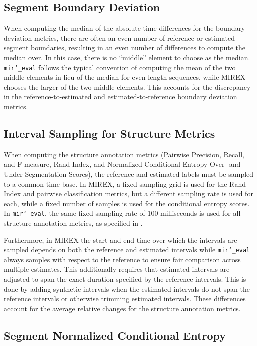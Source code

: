 \documentclass{article}
\def\mireval{\texttt{mir\char`_eval}}
\begin{document}
\subsection{Segment Boundary Deviation}

When computing the median of the absolute time differences for the boundary deviation metrics, there are often an even number of reference or estimated segment boundaries, resulting in an even number of differences to compute the median over.
In this case, there is no ``middle'' element to choose as the median.
\mireval{} follows the typical convention of computing the mean of the two middle elements in lieu of the median for even-length sequences, while MIREX chooses the larger of the two middle elements.
This accounts for the discrepancy in the reference-to-estimated and estimated-to-reference boundary deviation metrics.

\subsection{Interval Sampling for Structure Metrics}

When computing the structure annotation metrics (Pairwise Precision, Recall, and F-measure, Rand Index, and Normalized Conditional Entropy Over- and Under-Segmentation Scores), the reference and estimated labels must be sampled to a common time-base.
In MIREX, a fixed sampling grid is used for the Rand Index and pairwise classification metrics, but a different sampling rate is used for each, while a fixed number of samples is used for the conditional entropy scores.
In \mireval{}, the same fixed sampling rate of 100 milliseconds is used for all structure annotation metrics, as specified in \cite{willis2013mirex}.

Furthermore, in MIREX the start and end time over which the intervals are sampled depends on both the reference and estimated intervals while \mireval{} always samples with respect to the reference to ensure fair comparison across multiple estimates.
This additionally requires that estimated intervals are adjusted to span the exact duration specified by the reference intervals.
This is done by adding synthetic intervals when the estimated intervals do not span the reference intervals or otherwise trimming estimated intervals.
These differences account for the average relative changes for the structure annotation metrics.

\subsection{Segment Normalized Conditional Entropy}
\end{document}
